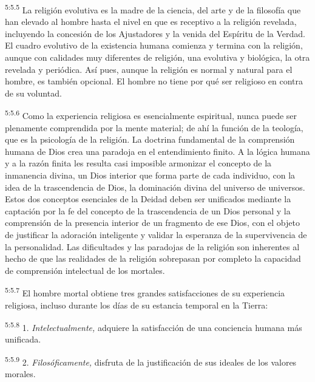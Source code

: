 \par
\textsuperscript{5:5.5} La religión evolutiva es la madre de la ciencia, del arte y de la filosofía que han elevado al hombre hasta el nivel en que es receptivo a la religión revelada, incluyendo la concesión de los Ajustadores y la venida del Espíritu de la Verdad. El cuadro evolutivo de la existencia humana comienza y termina con la religión, aunque con calidades muy diferentes de religión, una evolutiva y biológica, la otra revelada y periódica. Así pues, aunque la religión es normal y natural para el hombre, es también opcional. El hombre no tiene por qué ser religioso en contra de su voluntad.

\par
\textsuperscript{5:5.6} Como la experiencia religiosa es esencialmente espiritual, nunca puede ser plenamente comprendida por la mente material; de ahí la función de la teología, que es la psicología de la religión. La doctrina fundamental de la comprensión humana de Dios crea una paradoja en el entendimiento finito. A la lógica humana y a la razón finita les resulta casi imposible armonizar el concepto de la inmanencia divina, un Dios interior que forma parte de cada individuo, con la idea de la trascendencia de Dios, la dominación divina del universo de universos. Estos dos conceptos esenciales de la Deidad deben ser unificados mediante la captación por la fe del concepto de la trascendencia de un Dios personal y la comprensión de la presencia interior de un fragmento de ese Dios, con el objeto de justificar la adoración inteligente y validar la esperanza de la supervivencia de la personalidad. Las dificultades y las paradojas de la religión son inherentes al hecho de que las realidades de la religión sobrepasan por completo la capacidad de comprensión intelectual de los mortales.

\par
\textsuperscript{5:5.7} El hombre mortal obtiene tres grandes satisfacciones de su experiencia religiosa, incluso durante los días de su estancia temporal en la Tierra:

\par
\textsuperscript{5:5.8} 1. \textit{Intelectualmente,} adquiere la satisfacción de una conciencia humana más unificada.

\par
\textsuperscript{5:5.9} 2. \textit{Filosóficamente,} disfruta de la justificación de sus ideales de los valores morales.

